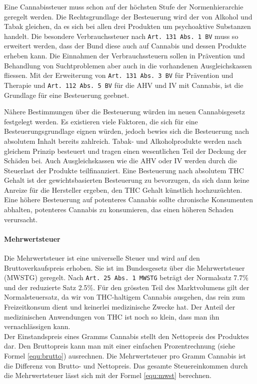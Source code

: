 \documentclass[../main.tex]{subfiles}
\begin{document}
	 \noindent
	 Eine Cannabissteuer muss schon auf der höchsten Stufe der Normenhierarchie geregelt werden. 
	 Die Rechtsgrundlage der Besteuerung wird der von Alkohol und Tabak gleichen, da es sich bei allen drei Produkten um psychoaktive Substanzen handelt.
	 Die besondere Verbrauchssteuer nach \texttt{Art. 131 Abs. 1 BV} muss so erweitert werden, dass der Bund diese auch auf Cannabis und dessen Produkte erheben kann.
	 Die Einnahmen der Verbrauchssteuern sollen in Prävention und Behandlung von Suchtproblemen aber auch in die vorhandenen Ausgleichskassen fliessen.
	 Mit der Erweiterung von \texttt{Art. 131 Abs. 3 BV} für Prävention und Therapie und \texttt{Art. 112 Abs. 5 BV} für die AHV und IV mit Cannabis, ist die Grundlage für eine Besteuerung geebnet.
	 	 
	 \noindent
	 Nähere Bestimmungen über die Besteuerung würden im neuen Cannabisgesetz festgelegt werden.
	 Es existieren viele Faktoren, die sich für eine Besteuerungsgrundlage eignen würden, jedoch bewies sich die Besteuerung nach absolutem Inhalt bereits zahlreich.
	 Tabak- und Alkoholprodukte werden nach gleichem Prinzip besteuert und tragen einen wesentlichen Teil der Deckung der Schäden bei.
	 Auch Ausgleichskassen wie die AHV oder IV werden durch die Steuerlast der Produkte teilfinanziert.
	 Eine Besteuerung nach absolutem THC Gehalt ist der gewichtsbasierten Besteuerung zu bevorzugen, da sich dann keine Anreize für die Hersteller ergeben, den THC Gehalt künstlich hochzuzüchten.
	 Eine höhere Besteuerung auf potenteres Cannabis sollte chronische Konsumenten abhalten, potenteres Cannabis zu konsumieren, das einen höheren Schaden verursacht.  
	 
	 \paragraph{Mehrwertsteuer}
	 Die Mehrwertsteuer ist eine universelle Steuer und wird auf den Bruttoverkaufspreis erhoben.
	 Sie ist im Bundesgesetz über die Mehrwertsteuer (MWSTG) geregelt.
	 Nach \texttt{Art. 25 Abs. 1 MWSTG} beträgt der Normalsatz 7.7\% und der reduzierte Satz 2.5\%.
	 Für den grössten Teil des Marktvolumens gilt der Normalsteuersatz, da wir von THC-haltigem Cannabis ausgehen, das rein zum Freizeitkonsum dient und keinerlei medizinische Zwecke hat. 
	 Der Anteil der medizinischen Anwendungen von THC ist noch so klein, dass man ihn vernachlässigen kann.\\
	 
	 \noindent
	 Der Einstandspreis eines Gramms Cannabis stellt den Nettopreis des Produktes dar.
	 Den Bruttopreis kann man mit einer einfachen Prozentrechnung (siehe Formel \ref{equ:brutto}) ausrechnen. 
	 Die Mehrwertsteuer pro Gramm Cannabis ist die Differenz von Brutto- und Nettopreis.
	 Das gesamte Steuereinkommen durch die Mehrwertsteuer lässt sich mit der Formel \ref{equ:mwst} berechnen.\\
	 
\end{document}
